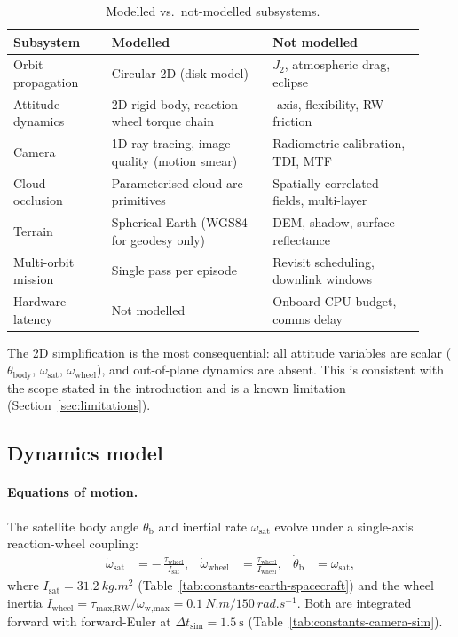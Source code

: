 \begin{table}[htbp]
  \centering
  \caption{Modelled vs.\ not-modelled subsystems.}
  \label{tab:simplifications}
  \renewcommand{\arraystretch}{1.3}
  \small
  \begin{tabular}{@{}>{\raggedright\arraybackslash}p{0.22\linewidth}>{\raggedright\arraybackslash}p{0.36\linewidth}>{\raggedright\arraybackslash}p{0.34\linewidth}@{}}
    \toprule
    Subsystem & Modelled & Not modelled \\
    \midrule
    Orbit propagation     & Circular 2D (disk model) & $J_2$, atmospheric drag, eclipse \\
    Attitude dynamics     & 2D rigid body, reaction-wheel torque chain & 3-axis, flexibility, RW friction \\
    Camera                & 1D ray tracing, image quality (motion smear) & Radiometric calibration, TDI, MTF \\
    Cloud occlusion       & Parameterised cloud-arc primitives & Spatially correlated fields, multi-layer \\
    Terrain               & Spherical Earth (WGS84 for geodesy only) & DEM, shadow, surface reflectance \\
    Multi-orbit mission   & Single pass per episode & Revisit scheduling, downlink windows \\
    Hardware latency      & Not modelled & Onboard CPU budget, comms delay \\
    \bottomrule
  \end{tabular}
\end{table}

The 2D simplification is the most consequential: all attitude variables are scalar ($\theta_\text{body}$, $\omega_\text{sat}$, $\omega_\text{wheel}$), and out-of-plane dynamics are absent.
This is consistent with the scope stated in the introduction and is a known limitation (Section~\ref{sec:limitations}).

\subsection{Dynamics model}
\label{sec:dynamics}

\paragraph{Equations of motion.}
The satellite body angle $\theta_\text{b}$ and inertial rate $\omega_\text{sat}$ evolve under a single-axis reaction-wheel coupling:
\begin{align}
  \dot\omega_\text{sat} &= -\,\frac{\tau_\text{wheel}}{I_\text{sat}}, &
  \dot\omega_\text{wheel} &= \frac{\tau_\text{wheel}}{I_\text{wheel}}, &
  \dot\theta_\text{b} &= \omega_\text{sat},
\end{align}
where $I_\text{sat} = \SI{31.2}{kg.m^2}$ (Table~\ref{tab:constants-earth-spacecraft}) and
the wheel inertia $I_\text{wheel} = \tau_\text{max,RW}/\omega_\text{w,max}= \SI{0.1}{N.m}/\SI{150}{rad.s^{-1}}$.
Both are integrated forward with forward-Euler at $\Delta t_\text{sim} = \SI{1.5}{\second}$ (Table~\ref{tab:constants-camera-sim}).

